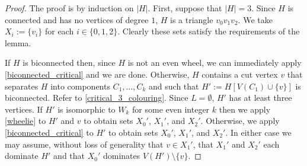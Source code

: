 \documentclass{article}
\theoremstyle{definition}
\begin{document}
\begin{proof}
  The proof is by induction on $|H|$.  First, suppose that $|H|=3$. Since $H$ is connected and has no vertices of degree $1$, $H$ is a triangle $v_0v_1v_2$. We take $X_i:=\{v_i\}$ for each $i\in\{0,1,2\}$.  Clearly these sets satisfy the requirements of the lemma.

  If $H$ is biconnected then, since $H$ is not an even wheel, we can immediately apply \cref{biconnected_critical} and we are done.  Otherwise, $H$ contains a cut vertex $v$ that separates $H$ into components $C_1,\ldots,C_k$ and such that $H':=H[V(C_1)\cup\{v\}]$ is biconnected. Refer to \cref{critical_3_colouring}. Since $L=\emptyset$, $H'$ has at least three vertices. If $H'$ is isomorphic to $W_k$ for some even integer $k$ then we apply \cref{wheelie} to $H'$ and $v$ to obtain sets $X_0'$, $X_1'$, and $X_2'$. Otherwise, we apply \cref{biconnected_critical} to $H'$ to obtain sets $X_0'$, $X_1'$, and $X_2'$.  In either case we may assume, without loss of generality that $v\in X_1'$, that $X_1'$ and $X_2'$ each dominate $H'$ and that $X_0'$ dominates $V(H')\setminus\{v\}$.


\end{proof}
\end{document}
